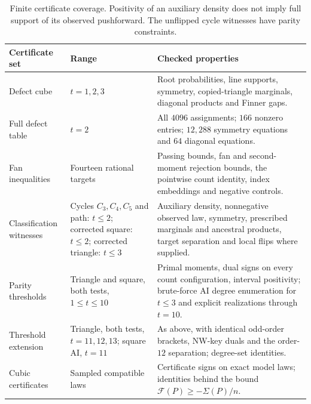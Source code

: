 \begin{table}[!htbp]
\centering\small
\renewcommand{\arraystretch}{1.12}
\begin{tabular}{@{}>{\raggedright\arraybackslash}p{.21\linewidth}>{\raggedright\arraybackslash}p{.23\linewidth}>{\raggedright\arraybackslash}p{.48\linewidth}@{}}
\toprule
Certificate set & Range & Checked properties\\
\midrule
Defect cube & $t=1,2,3$ & Root probabilities, line supports, symmetry, copied-triangle marginals, diagonal products and Finner gaps.\\[3pt]
Full defect table & $t=2$ & All $4096$ assignments; $166$ nonzero entries; $12{,}288$ symmetry equations and $64$ diagonal equations.\\[3pt]
Fan inequalities & Fourteen rational targets & Passing bounds, fan and second-moment rejection bounds, the pointwise count identity, index embeddings and negative controls.\\[3pt]
Classification witnesses & Cycles $C_3,C_4,C_5$ and path: $t\le2$; corrected square: $t\le2$; corrected triangle: $t\le3$ & Auxiliary density, nonnegative observed law, symmetry, prescribed marginals and ancestral products, target separation and local flips where supplied.\\[3pt]
Parity thresholds & Triangle and square, both tests, $1\le t\le10$ & Primal moments, dual signs on every count configuration, interval positivity; brute-force AI degree enumeration for $t\le3$ and explicit realizations through $t=10$.\\[3pt]
Threshold extension & Triangle, both tests, $t=11,12,13$; square AI, $t=11$ & As above, with identical odd-order brackets, NW-key duals and the order-$12$ separation; degree-set identities.\\[3pt]
Cubic certificates & Sampled compatible laws & Certificate signs on exact model laws; identities behind the bound $\mathcal F(P)\ge-\Sigma(P)/n$.\\
\bottomrule
\end{tabular}
\caption{Finite certificate coverage. Positivity of an auxiliary density does not imply full support of its observed pushforward. The unflipped cycle witnesses have parity constraints.}\label{tab:verification}
\end{table}
